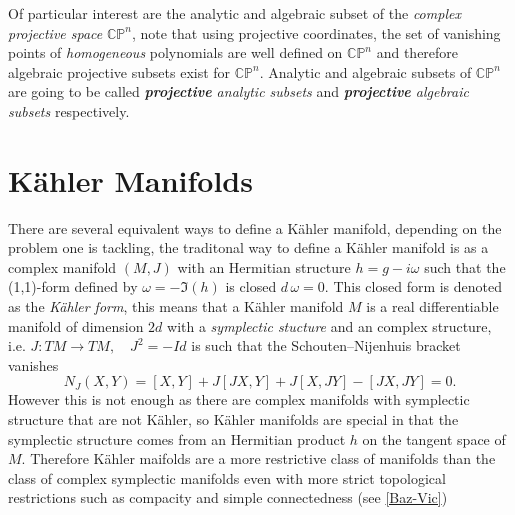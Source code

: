 \documentclass[12pt,twoside,a4paper]{report}
\newcommand{\cp}{\ensuremath{\mathbb{CP}}}
\begin{document}
Of particular interest are the analytic and algebraic subset of the \emph{complex projective space} $\cp^{n}$, note that using projective coordinates, the set of vanishing points of \emph{homogeneous} polynomials are well defined on $\cp^n$ and therefore algebraic projective subsets exist for $\cp^{n}$. Analytic and algebraic subsets of $\cp^n$ are going to be called  \emph{\textbf{projective} analytic subsets} and \emph{\textbf{projective} algebraic subsets} respectively.


\section{Kähler Manifolds}
There are several equivalent ways to define a K\"ahler manifold, depending on the problem one is tackling, the traditonal way to define a Kähler manifold is as a complex manifold $(M,J)$ with an Hermitian structure $h=g-i\omega$ such that the (1,1)-form defined by $\omega=-\Im (h)$ is closed $d\,\omega=0$. This closed form is denoted as the \emph{K\"ahler form}, this means that a Kähler manifold $M$ is a real differentiable manifold of dimension $2d$ with a \emph{symplectic stucture} and an complex structure, i.e. $J:TM\rightarrow TM,\quad J^2=-Id$ is such that the Schouten–Nijenhuis bracket vanishes
\[
  N_{J}(X,Y)=[X,Y]+J[JX,Y]+J[X,JY]-[JX,JY]=0.
\]
However this is not enough as there are complex manifolds with symplectic structure that are not Kähler, so Kähler manifolds are special in that the symplectic structure comes from an Hermitian product $h$ on the tangent space of $M$. Therefore Kähler maifolds are a more restrictive class of manifolds than the class of complex symplectic manifolds even with more strict topological restrictions such as compacity and simple connectedness (see \ref{Baz-Vic})
\end{document}
